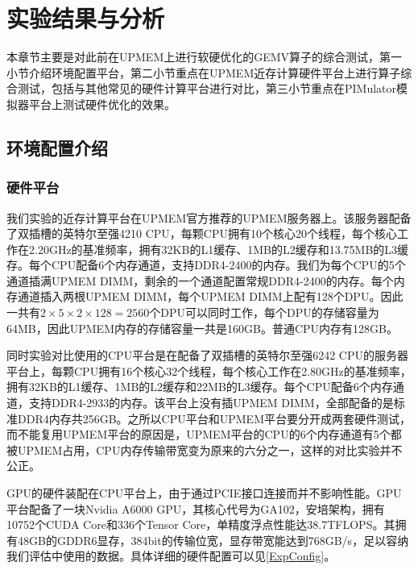 \chapter{实验结果与分析}
本章节主要是对此前在UPMEM上进行软硬优化的GEMV算子的综合测试，第一小节介绍环境配置平台，第二小节重点在UPMEM近存计算硬件平台上进行算子综合测试，包括与其他常见的硬件计算平台进行对比，第三小节重点在PIMulator模拟器平台上测试硬件优化的效果。

\section{环境配置介绍}

\subsection{硬件平台}
我们实验的近存计算平台在UPMEM官方推荐的UPMEM服务器上。该服务器配备了双插槽的英特尔至强4210 CPU，每颗CPU拥有10个核心20个线程，每个核心工作在2.20GHz的基准频率，拥有32KB的L1缓存、1MB的L2缓存和13.75MB的L3缓存。每个CPU配备6个内存通道，支持DDR4-2400的内存。我们为每个CPU的5个通道插满UPMEM DIMM，剩余的一个通道配置常规DDR4-2400的内存。每个内存通道插入两根UPMEM DIMM，每个UPMEM DIMM上配有128个DPU。因此一共有$2\times 5\times 2\times 128=2560$个DPU可以同时工作，每个DPU的存储容量为64MB，因此UPMEM内存的存储容量一共是160GB。普通CPU内存有128GB。

同时实验对比使用的CPU平台是在配备了双插槽的英特尔至强6242 CPU的服务器平台上，每颗CPU拥有16个核心32个线程，每个核心工作在2.80GHz的基准频率，拥有32KB的L1缓存、1MB的L2缓存和22MB的L3缓存。每个CPU配备6个内存通道，支持DDR4-2933的内存。该平台上没有插UPMEM DIMM，全部配备的是标准DDR4内存共256GB。之所以CPU平台和UPMEM平台要分开成两套硬件测试，而不能复用UPMEM平台的原因是，UPMEM平台的CPU的6个内存通道有5个都被UPMEM占用，CPU内存传输带宽变为原来的六分之一，这样的对比实验并不公正。

GPU的硬件装配在CPU平台上，由于通过PCIE接口连接而并不影响性能。GPU平台配备了一块Nvidia A6000 GPU，其核心代号为GA102，安培架构，拥有10752个CUDA Core和336个Tensor Core，单精度浮点性能达38.7TFLOPS。其拥有48GB的GDDR6显存，384bit的传输位宽，显存带宽能达到768GB/s，足以容纳我们评估中使用的数据。具体详细的硬件配置可以见\ref{ExpConfig}。

